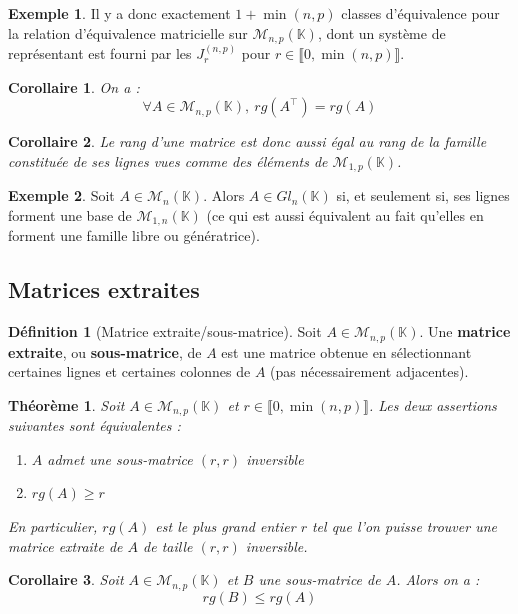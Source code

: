 \documentclass[french]{book}
\newcommand{\K}{\mathbb{K}}
\theoremstyle{plain}
\newtheorem{thm}{Théorème}[chapter]
\newtheorem{cor}{Corollaire}[chapter]
\theoremstyle{definition}
\newtheorem{dfn}{Définition}[chapter]
\newtheorem{exa}{Exemple}[chapter]
\theoremstyle{remark}
\begin{document}
\begin{exa}
	Il y a donc exactement $1+\min(n,p)$ classes d'équivalence pour la relation d'équivalence matricielle sur $\mathcal{M}_{n,p}(\K)$, dont un système de représentant est fourni par les $J_r^{(n,p)}$ pour $r\in\llbracket0,\min(n,p)\rrbracket$.
\end{exa}
\begin{cor}
	On a : $$\forall A\in\mathcal{M}_{n,p}(\K),\ rg(A^\top)=rg(A)$$
\end{cor}
\begin{cor}
	Le rang d'une matrice est donc aussi égal au rang de la famille constituée de ses lignes vues comme des éléments de $\mathcal{M}_{1,p}(\K)$.
\end{cor}
\begin{exa}
	Soit $A\in\mathcal{M}_n(\K)$. Alors $A\in Gl_n(\K)$ si, et seulement si, ses lignes forment une base de $\mathcal{M}_{1,n}(\K)$ (ce qui est aussi équivalent au fait qu'elles en forment une famille libre ou génératrice).
\end{exa}
\subsection{Matrices extraites}
\begin{dfn}[Matrice extraite/sous-matrice]
	Soit $A\in\mathcal{M}_{n,p}(\K)$. Une \textbf{matrice extraite}, ou \textbf{sous-matrice}, de $A$ est une matrice obtenue en sélectionnant certaines lignes et certaines colonnes de $A$ (pas nécessairement adjacentes).
\end{dfn}
\begin{thm}
	Soit $A\in\mathcal{M}_{n,p}(\K)$ et $r\in\llbracket0,\min(n,p)\rrbracket$. Les deux assertions suivantes sont équivalentes : \begin{enumerate}
		\item $A$ admet une sous-matrice $(r,r)$ inversible
		\item $rg(A)\geqslant r$
	\end{enumerate}
	En particulier, $rg(A)$ est le plus grand entier $r$ tel que l'on puisse trouver une matrice extraite de $A$ de taille $(r,r)$ inversible.
\end{thm}
\begin{cor}
	Soit $A\in\mathcal{M}_{n,p}(\K)$ et $B$ une sous-matrice de $A$. Alors on a : $$rg(B)\leqslant rg(A)$$
\end{cor}
\end{document}
